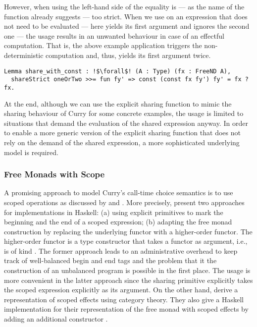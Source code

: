 However, when using  the left\--hand side of the equality is --- as the name of the function already suggests --- too strict.
When we use  on an expression that does not need to be evaluated --- here  yields its first argument and ignores the second one --- the usage results in an unwanted behaviour in case of an effectful computation.
That is, the above example application triggers the non\--deterministic computation  and, thus, yields its first argument  twice.

\begin{verbatim}
Lemma share_with_const : !$\forall$! (A : Type) (fx : FreeND A),
  shareStrict oneOrTwo >>= fun fy' => const (const fx fy') fy' = fx ? fx.
\end{verbatim}

At the end, although we can use the explicit sharing function  to mimic the sharing behaviour of Curry for some concrete examples, the usage is limited to situations that demand the evaluation of the shared expression anyway.
In order to enable a more generic version of the explicit sharing function that does not rely on the demand of the shared expression, a more sophisticated underlying model is required.

\subsubsection{Free Monads with Scope}

A promising approach to model Curry's call\--time choice semantics is to use scoped operations as discussed by \citet{wu2014effect} and \citet{pirog2018syntax}.
More precisely, \citeauthor{wu2014effect} present two approaches for implementations in Haskell: (a) using explicit primitives to mark the beginning and the end of a scoped expression; (b) adapting the free monad construction by replacing the underlying functor with a higher\--order functor.
The higher\--order functor is a type constructor that takes a functor as argument, i.e., is of kind \hinl{(* -> *) -> * -> *}.
The former approach leads to an administrative overhead to keep track of well\--balanced begin and end tags and the problem that it the construction of an unbalanced program is possible in the first place.
The usage is more convenient in the latter approach since the sharing primitive explicitly takes the scoped expression explicitly as its argument.
On the other hand, \citeauthor{pirog2018syntax} derive a representation of scoped effects using category theory.
They also give a Haskell implementation for their representation of the free monad with scoped effects by adding an additional constructor .

